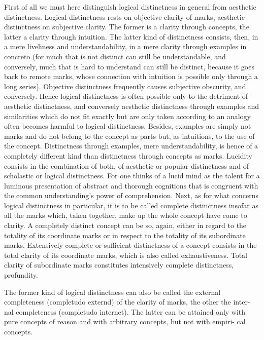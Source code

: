 First of all we must here distinguish
logical distinctness in general from
aesthetic distinctness.
Logical distinctness rests on objective clarity of marks,
aesthetic distinctness on subjective clarity.
The former is a clarity through concepts,
the latter a clarity through intuition.
The latter kind of distinctness consists, then,
in a mere liveliness and understandability,
in a mere clarity through examples in concreto
(for much that is not distinct can still be understandable, and
conversely, much that is hard to understand can still be distinct,
because it goes back to remote marks, whose connection with intuition
is possible only through a long series).
Objective distinctness frequently causes
subjective obscurity, and conversely.
Hence logical distinctness is often possible only to the detriment of
aesthetic distinctness, and conversely aesthetic distinctness
through examples and similarities which do not fit exactly but are only
taken according to an analogy often becomes harmful to logical distinctness.
Besides, examples are simply not marks and do not belong to the
concept as parts but, as intuitions, to the use of the concept.
Distinctness through examples, mere understandability, is hence
of a completely different kind than distinctness through concepts as marks.
Lucidity consists in the combination of both,
of aesthetic or popular distinctness and
of scholastic or logical distinctness.
For one thinks of a lucid mind as the talent for a
luminous presentation of abstract and thorough cognitions
that is congruent with the common understanding's power of comprehension.
Next, as for what concerns logical distinctness in particular,
it is to be called complete distinctness insofar as all the marks
which, taken together, make up the whole concept have come to clarity.
A completely distinct concept can be so, again,
either in regard to the totality of its coordinate marks or
in respect to the totality of its subordinate marks.
Extensively complete or sufficient distinctness of a concept
consists in the total clarity of its coordinate marks,
which is also called exhaustiveness.
Total clarity of subordinate marks constitutes
intensively complete distinctness, profundity.

The former kind of logical distinctness can also be called the external
completeness (completudo externd) of the clarity of marks, the other the inter-
nal completeness (completudo internet). The latter can be attained only with
pure concepts of reason and with arbitrary concepts, but not with empiri-
cal concepts.

